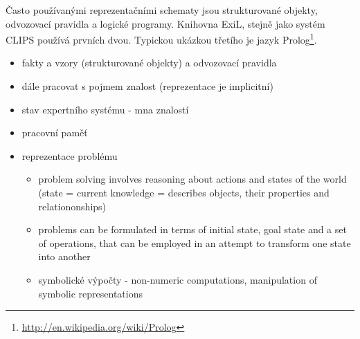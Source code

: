 Často používanými reprezentačními schematy jsou strukturované objekty,
odvozovací pravidla a logické programy. Knihovna ExiL, stejně jako systém CLIPS
používá prvních dvou. Typickou ukázkou třetího je jazyk
Prolog\footnote{\url{http://en.wikipedia.org/wiki/Prolog}}.

\begin{framed}
  \begin{itemize}
    \item fakty a vzory (strukturované objekty) a odvozovací pravidla
    \item dále pracovat s pojmem znalost (reprezentace je implicitní)
    \item stav expertního systému - mna znalostí
    \item pracovní paměť
    \item reprezentace problému
      \begin{itemize}
        \item problem solving involves reasoning about actions and states of the
          world (state = current knowledge = describes objects, their properties and
          relationonships)
        \item problems can be formulated in terms of initial state, goal state
          and a set of operations, that can be employed in an attempt to
          transform one state into another
        \item symbolické výpočty - non-numeric computations, manipulation of
          symbolic representations
      \end{itemize}
  \end{itemize}
\end{framed}

